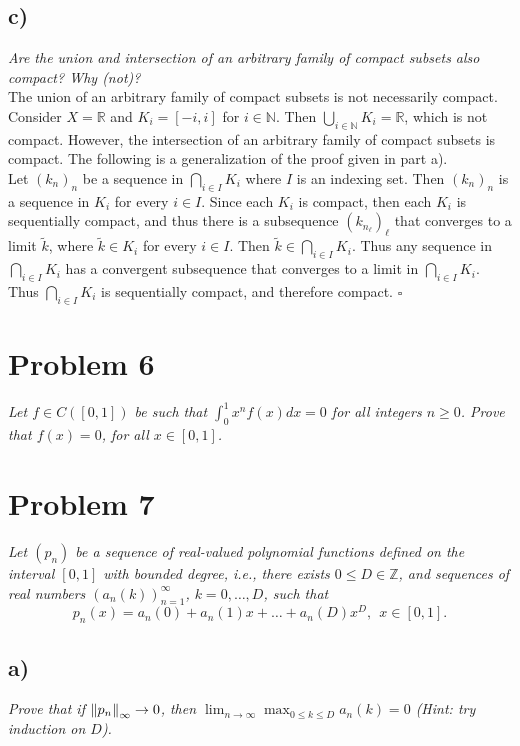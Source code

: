 \documentclass[12pt]{article}
\begin{document}
\subsection*{ c)}
{\it Are the union and intersection of an arbitrary family of compact subsets also compact?  Why (not)?} \\

The union of an arbitrary family of compact subsets is not necessarily compact.  Consider $X = \mathbb{R}$ and $K_i = [-i, i]$ for $i\in \mathbb{N}$.  Then $\bigcup_{i\in\mathbb{N}}K_i = \mathbb{R}$, which is not compact.  However, the intersection of an arbitrary family of compact subsets is compact.  The following is a generalization of the proof given in part a). \\

Let $(k_n)_n$ be a sequence in $\bigcap_{i\in I} K_i$ where $I$ is an indexing set.  Then $(k_n)_n$ is a sequence in $K_i$ for every $i\in I$.  Since each $K_i$ is compact, then each $K_i$ is sequentially compact, and thus there is a subsequence $(k_{n_\ell})_\ell$ that converges to a limit $\tilde{k}$, where $\tilde{k} \in K_i$ for every $i\in I$.  Then $\tilde{k} \in \bigcap_{i\in I} K_i$.  Thus any sequence in $\bigcap_{i\in I} K_i$ has a convergent subsequence that converges to a limit in $\bigcap_{i\in I} K_i$.  Thus $\bigcap_{i\in I} K_i$ is sequentially compact, and therefore compact. \hfill $\square$

\section*{Problem 6}
{\it Let $f \in C([0,1])$ be such that $\int_0^1x^nf(x)dx = 0$ for all integers $n \geq 0$.  Prove that $f(x) = 0$, for all $x \in [0,1]$.}

\section*{Problem 7}
{\it Let $(p_n)$ be a sequence of real-valued polynomial functions defined on the interval $[0,1]$ with bounded degree, i.e., there exists $0 \leq D \in \mathbb{Z}$, and sequences of real numbers $(a_n(k))_{n=1}^{\infty}$, $k = 0, \dots, D$, such that}
\begin{equation}
	\label{problem_7_polynomial}
	p_n(x) = a_n(0) + a_n(1)x + \dots + a_n(D)x^D,\ \ x \in [0,1].
\end{equation}

\subsection*{ a)}
{\it Prove that if $\norm{p_n}_\infty \rightarrow 0$, then $\lim_{n\rightarrow\infty}\max_{0\leq k\leq D}a_n(k) = 0$ (Hint: try induction on $D$).}
\end{document}

